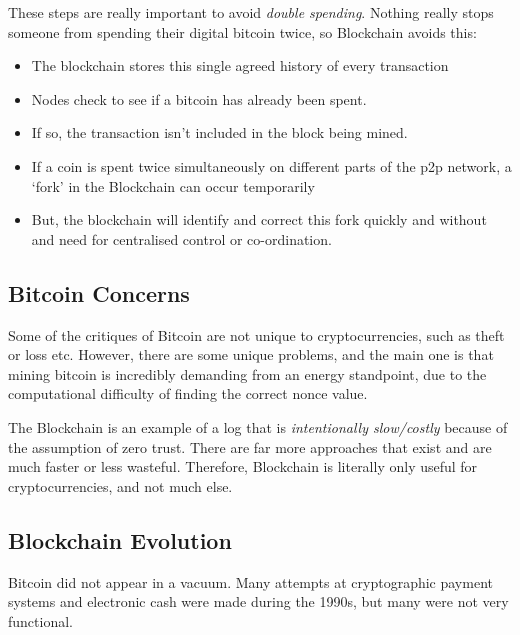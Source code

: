\documentclass[11pt,a4paper,titlepage,dvipsnames,cmyk]{scrartcl}
\begin{document}
These steps are really important to avoid \textit{double spending}. Nothing really stops someone from spending their digital bitcoin twice, so Blockchain avoids this:
\begin{itemize}
    \item The blockchain stores this single agreed history of every transaction
    \item Nodes check to see if a bitcoin has already been spent.
    \item If so, the transaction isn't included in the block being mined.
    \item If a coin is spent twice simultaneously on different parts of the p2p network, a `fork' in the Blockchain can occur temporarily
    \item But, the blockchain will identify and correct this fork quickly and without and need for centralised control or co-ordination.
\end{itemize}

\subsection{Bitcoin Concerns}
Some of the critiques of Bitcoin are not unique to cryptocurrencies, such as theft or loss etc. However, there are some unique problems, and the main one is that mining bitcoin is incredibly demanding from an energy standpoint, due to the computational difficulty of finding the correct nonce value.

The Blockchain is an example of a log that is \textit{intentionally slow/costly} because of the assumption of zero trust. There are far more approaches that exist and are much faster or less wasteful. Therefore, Blockchain is literally only useful for cryptocurrencies, and not much else.

\subsection{Blockchain Evolution}
Bitcoin did not appear in a vacuum. Many attempts at cryptographic payment systems and electronic cash were made during the 1990s, but many were not very functional.
\end{document}
